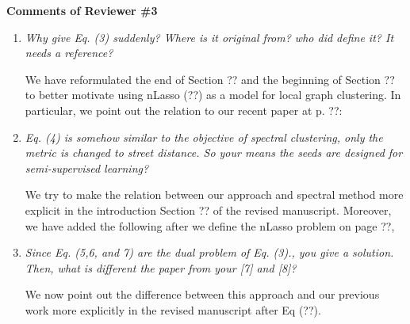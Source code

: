 \documentclass[11pt,onecolumn]{IEEEtran}
\begin{document}
\begin{center}
{\bf\large Comments of Reviewer \#3}
\vspace{1mm}
\end{center}
\begin{enumerate}

\item[3.1] {\em Why give Eq. (3) suddenly? Where is it original from? who did define it? It needs a reference?}

\vspace*{2mm}
We have reformulated the end of Section ?? and the beginning of Section ?? to better motivate 
using nLasso (??) as a model for local graph clustering. In particular, we point out the relation to 
our recent paper at p. ??: 

\vspace*{3mm} 

\item[3.2] {\em Eq. (4) is somehow similar to the objective of spectral clustering, only the metric is changed
to street distance. So your means the seeds are designed for semi-supervised learning?}

\vspace*{2mm}
We try to make the relation between our approach and spectral method more explicit in the introduction Section ?? 
of the revised manuscript. Moreover, we have added the following after we define the nLasso problem on page ??, 
\vspace*{3mm} 

\item[3.3] {\em Since Eq. (5,6, and 7) are the dual problem of Eq. (3)., you give a solution. Then, what is
different the paper from your [7] and [8]? }

\vspace*{2mm}
We now point out the difference between this approach and our previous work more explicitly in the 
revised manuscript after Eq (??). 
\vspace*{3mm} 

\end{enumerate} 



\vspace{5mm}


% 
%



\end{document}
